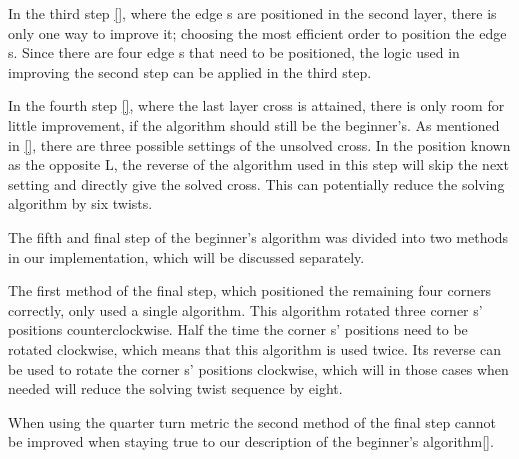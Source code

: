 In the third step \ref{}, where the edge \cpiece{}s are positioned in the second layer, there is only one way to improve it; choosing the most efficient order to position the edge \cpiece{}s. Since there are four edge \cpiece{}s that need to be positioned, the logic used in improving the second step can be applied in the third step.

In the fourth step \ref{}, where the last layer cross is attained, there is only room for little improvement, if the algorithm should still be the beginner's. As mentioned in \ref{}, there are three possible settings of the unsolved cross. In the position known as the opposite L, the reverse of the algorithm used in this step will skip the next setting and directly give the solved cross. This can potentially reduce the solving algorithm by six twists.


The fifth and final step of the beginner's algorithm was divided into two methods in our implementation, which will be discussed separately.


The first method of the final step, which positioned the remaining four corners correctly, only used a single algorithm. This algorithm rotated three corner \cpiece{}s' positions counterclockwise. Half the time the corner \cpiece{}s' positions need to be rotated clockwise, which means that this algorithm is used twice. Its reverse can be used to rotate the corner \cpiece{}s' positions clockwise, which will in those cases when needed will reduce the solving twist sequence by eight.

When using the quarter turn metric the second method of the final step cannot be improved when staying true to our description of the beginner's algorithm\ref{}.